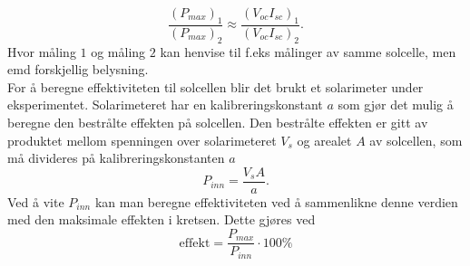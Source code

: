 \documentclass[%
 reprint,
 amsmath,amssymb,
 aps,
 norsk,
 booktabs
]{revtex4-1}
\begin{document}
\begin{equation}
  \frac{\left(P_{max}\right)_1}{\left(P_{max}\right)_2} \approx \frac{\left(V_{oc}I_{sc}\right)_1}{\left(V_{oc}I_{sc}\right)_2}. \label{maxP}
\end{equation}Hvor måling $1$ og måling $2$ kan henvise til f.eks målinger av samme solcelle, men emd forskjellig belysning.\\For å beregne effektiviteten til solcellen blir det brukt et solarimeter under eksperimentet. Solarimeteret har en kalibreringskonstant $a$ som gjør det mulig å beregne den bestrålte effekten på solcellen. Den bestrålte effekten er gitt av produktet mellom spenningen over solarimeteret $V_s$ og arealet $A$ av solcellen, som må divideres på kalibreringskonstanten $a$
\begin{equation}
  P_{inn} = \frac{V_sA}{a} \label{kalibrering}.
\end{equation}
Ved å vite $P_{inn}$ kan man beregne effektiviteten ved å sammenlikne denne verdien med den maksimale effekten i kretsen. Dette gjøres ved
\begin{equation}
  \text{effekt} = \frac{P_{max}}{P_{inn}}\cdot 100\%\label{effekt}
\end{equation}
\end{document}
